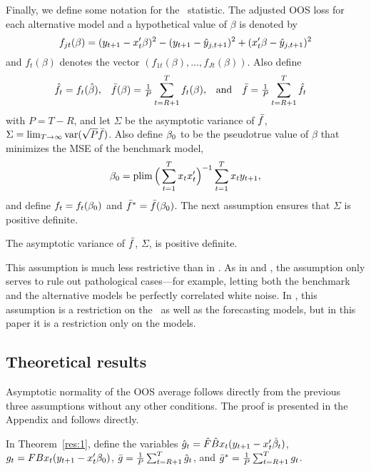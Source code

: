 \documentclass[12pt,fleqn]{article}
\begin{document}
Finally, we define some notation for the \oos\ statistic. The
adjusted OOS loss for each alternative model and a hypothetical value
of $\beta$ is denoted by
\begin{equation}
  f_{jt}(\beta) = (y_{t+1} - x_t'\beta)^2
  - (y_{t+1} - \hat{y}_{j,t+1})^2 + (x_t'\beta - \hat{y}_{j,t+1})^2
\end{equation}
and $f_t(\beta)$ denotes the vector $(f_{1t}(\beta),\dots,f_{Jt}(\beta))$.
Also define
\begin{align*}
  \hat{f}_t &= f_t(\hat{\beta}),
  &\bar{f}(\beta) &= \tfrac{1}{P} \sum_{t=R+1}^T f_t(\beta),
  &\text{and}&
  &\bar{f} &= \tfrac1P \sum_{t=R+1}^{T} \hat{f}_t
\end{align*}
with $P = T - R$, and let $\Sigma$ be the asymptotic variance of
$\bar{f}$, $\Sigma = \lim_{T \to \infty} \operatorname{var}(\sqrt{P} \bar{f})$.
Also define $\btrue$ to be the pseudotrue value of
$\beta$ that minimizes the MSE of the benchmark model,
\begin{equation*}
  \btrue = \plim \Big( \sum_{t=1}^T x_t x_t' \Big)^{-1} \sum_{t=1}^T x_t y_{t+1},
\end{equation*}
and define $f_t = f_t(\btrue)$ and $\fb^* = \fb(\btrue)$.
The next assumption ensures that $\Sigma$ is positive definite.
\begin{asmp}\label{a4}%
  The asymptotic variance of $\bar{f}$, $\Sigma$, is positive definite.
\end{asmp}

This assumption is much less restrictive than in \cite{Wes:96}.  As in
\cite{GiW:06} and \citet{ClW:06,ClW:07}, the assumption only serves to
rule out pathological cases---for example, letting both the benchmark
and the alternative models be perfectly correlated white noise. In
\citet{Wes:96}, this assumption is a restriction on the \dgp\ as well
as the forecasting models, but in this paper it is a restriction only
on the models.

\subsection{Theoretical results}
\label{sec:1b}

Asymptotic normality of the OOS average follows directly from the
previous three assumptions without any other conditions. The proof is
presented in the Appendix and follows \citet{Wes:96} directly.

\begin{thm}\label{res:1}\end{thm}
In Theorem~\ref{res:1}, define the variables
$\hat{g}_t = \hat{F} \hat{B} x_t(y_{t+1} - x_t'\hat{\beta}_t)$,
$g_t = F B x_t (y_{t+1} - x_t'\btrue)$,
$\bar{g} = \tfrac{1}{P} \sum_{t=R+1}^T \hat{g}_t$, and $\bar{g}^* = \tfrac{1}{P} \sum_{t=R+1}^T g_t$.
\end{document}

